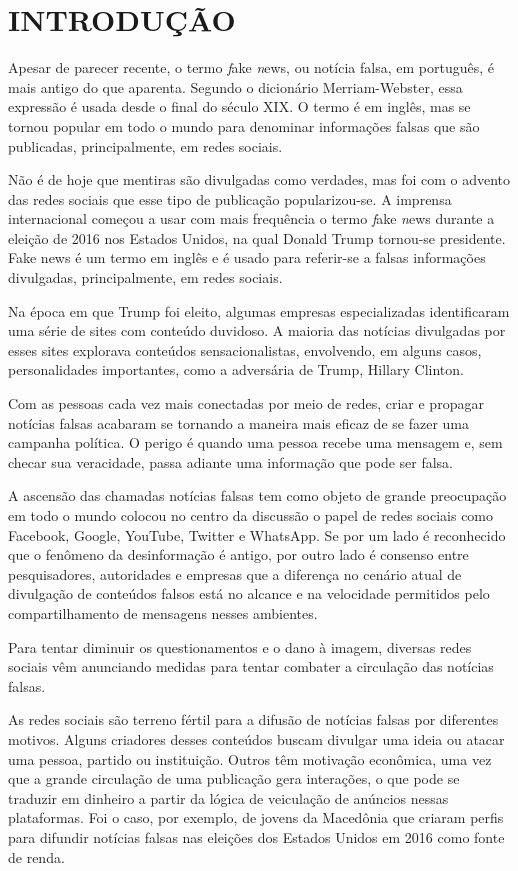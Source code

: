 
\chapter{INTRODUÇÃO}
\label{chap:introducao}

Apesar de parecer recente, o termo \textit fake  \textit news, ou notícia falsa, em português, é mais antigo do que aparenta. Segundo o dicionário Merriam-Webster, essa expressão é usada desde o final do século XIX. O termo é em inglês, mas se tornou popular em todo o mundo para denominar informações falsas que são publicadas, principalmente, em redes sociais.

Não é de hoje que mentiras são divulgadas como verdades, mas foi com o advento das redes sociais que esse tipo de publicação popularizou-se. A imprensa internacional começou a usar com mais frequência o termo \textit fake \textit news durante a eleição de 2016 nos Estados Unidos, na qual Donald Trump tornou-se presidente. Fake news é um termo em inglês e é usado para referir-se a falsas informações divulgadas, principalmente, em redes sociais.

Na época em que Trump foi eleito, algumas empresas especializadas identificaram uma série de sites com conteúdo duvidoso. A maioria das notícias divulgadas por esses sites explorava conteúdos sensacionalistas, envolvendo, em alguns casos, personalidades importantes, como a adversária de Trump, Hillary Clinton. \cite{fakenews}

Com as pessoas cada vez mais conectadas por meio de redes, criar e propagar notícias falsas acabaram se tornando a maneira mais eficaz de se fazer uma campanha política. O perigo é quando uma pessoa recebe uma mensagem e, sem checar sua veracidade, passa adiante uma informação que pode ser falsa. 

A ascensão das chamadas notícias falsas tem como objeto de grande preocupação em todo o mundo colocou no centro da discussão o papel de redes sociais como Facebook, Google, YouTube, Twitter e WhatsApp. Se por um lado é reconhecido que o fenômeno da desinformação é antigo, por outro lado é consenso entre pesquisadores, autoridades e empresas que a diferença no cenário atual de divulgação de conteúdos falsos está no alcance e na velocidade permitidos pelo compartilhamento de mensagens nesses ambientes.

Para tentar diminuir os questionamentos e o dano à imagem, diversas redes sociais vêm anunciando medidas para tentar combater a circulação das notícias falsas.

As redes sociais são terreno fértil para a difusão de notícias falsas por diferentes motivos. Alguns criadores desses conteúdos buscam divulgar uma ideia ou atacar uma pessoa, partido ou instituição. Outros têm motivação econômica, uma vez que a grande circulação de uma publicação gera interações, o que pode se traduzir em dinheiro a partir da lógica de veiculação de anúncios nessas plataformas. Foi o caso, por exemplo, de jovens da Macedônia que criaram perfis para difundir notícias falsas nas eleições dos Estados Unidos em 2016 como fonte de renda.

